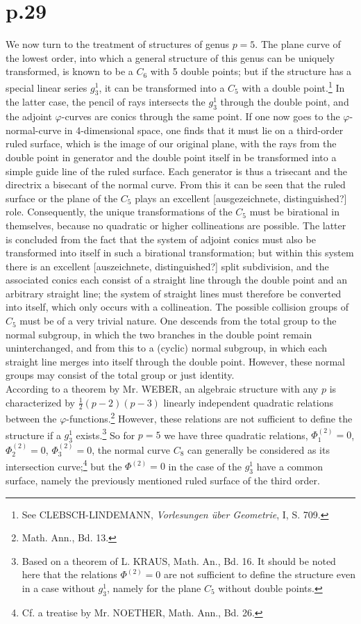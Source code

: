 \documentclass[leqno]{article}
\begin{document}
\section{p.29}
We now turn to the treatment of structures of genus $p=5$. The plane curve of the lowest order, into which a general structure of this genus can be uniquely transformed, is known to be a $C_6$ with 5 double points; but if the structure has a special linear series $g_3^1$, it can be transformed into a $C_5$ with a double point.\footnote{See CLEBSCH-LINDEMANN, \textit{Vorlesungen \"uber Geometrie}, I, S. 709.} In the latter case, the pencil of rays intersects the $g_3^1$ through the double point, and the adjoint $\varphi$-curves are conics through the same point. If one now goes to the $\varphi$-normal-curve in 4-dimensional space, one finds that it must lie on a third-order ruled surface, which is the image of our original plane, with the rays from the double point in generator and the double point itself in be transformed into a simple guide line of the ruled surface. Each generator is thus a trisecant and the directrix a bisecant of the normal curve. From this it can be seen that the ruled surface or the plane of the $C_5$ plays an excellent [ausgezeichnete, distinguished?] role. Consequently, the unique transformations of the $C_5$ must be birational in themselves, because no quadratic or higher collineations are possible. The latter is concluded from the fact that the system of adjoint conics must also be transformed into itself in such a birational transformation; but within this system there is an excellent [auszeichnete, distinguished?] split subdivision, and the associated conics each consist of a straight line through the double point and an arbitrary straight line; the system of straight lines must therefore be converted into itself, which only occurs with a collineation. The possible collision groups of $C_5$ must be of a very trivial nature. One descends from the total group to the normal subgroup, in which the two branches in the double point remain uninterchanged, and from this to a (cyclic) normal subgroup, in which each straight line merges into itself through the double point. However, these normal groups may consist of the total group or just identity. \\
According to a theorem by Mr. WEBER, an algebraic structure with any $p$ is characterized by $\frac{1}{2}(p-2)(p-3)$ linearly independent quadratic relations between the $\varphi$-functions.\footnote{Math. Ann., Bd. 13.} However, these relations are not sufficient to define the structure if a $g_3^1$ exists.\footnote{Based on a theorem of L. KRAUS, Math. An., Bd. 16. It should be noted here that the relations $\Phi^{(2)}=0$ are not sufficient to define the structure even in a case without $g_3^1$, namely for the plane $C_5$ without double points.} So for $p=5$ we have three quadratic relations, $\Phi_1^{(2)}=0$, $\Phi_2^{(2)}=0$, $\Phi_3^{(2)}=0 $, the normal curve $C_8$ can generally be considered as its intersection curve;\footnote{Cf. a treatise by Mr. NOETHER, Math. Ann., Bd. 26.} but the $\Phi^{(2)}=0$ in the case of the $g_3^1$ have a common surface, namely the previously mentioned ruled surface of the third order.
\end{document}
